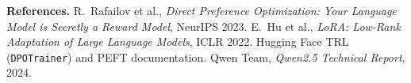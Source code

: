 \documentclass[10pt]{article}
\newcommand{\code}[1]{\texttt{\small #1}}
\begin{document}
\textbf{References.} R.~Rafailov et al., \emph{Direct Preference Optimization: Your Language Model is Secretly a Reward Model}, NeurIPS 2023. E.~Hu et al., \emph{LoRA: Low-Rank Adaptation of Large Language Models}, ICLR 2022. Hugging Face TRL (\code{DPOTrainer}) and PEFT documentation. Qwen Team, \emph{Qwen2.5 Technical Report}, 2024.
\end{document}
